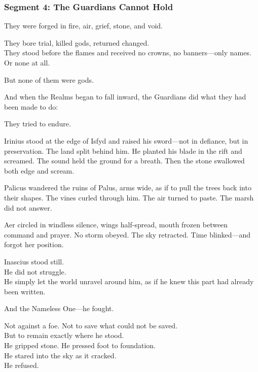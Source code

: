 \documentclass[9pt]{article}
\begin{document}
\newpage

\subsubsection*{Segment 4: The Guardians Cannot Hold}

They were forged in fire, air, grief, stone, and void.

\vspace{0.5em}
They bore trial, killed gods, returned changed.\\
They stood before the flames and received no crowns, no banners---only names.\\
Or none at all.

\vspace{0.5em}
But none of them were gods.

\vspace{0.5em}
And when the Realms began to fall inward, the Guardians did what they had been made to do:

\vspace{0.5em}
They tried to endure.

\vspace{0.5em}
Irinius stood at the edge of Isfyd and raised his sword---not in defiance, but in preservation. The land split behind him. He planted his blade in the rift and screamed. The sound held the ground for a breath. Then the stone swallowed both edge and scream.

\vspace{0.5em}
Palicus wandered the ruins of Palus, arms wide, as if to pull the trees back into their shapes. The vines curled through him. The air turned to paste. The marsh did not answer.

\vspace{0.5em}
Aer circled in windless silence, wings half-spread, mouth frozen between command and prayer. No storm obeyed. The sky retracted. Time blinked---and forgot her position.

\vspace{0.5em}
Inascius stood still.\\
He did not struggle.\\
He simply let the world unravel around him, as if he knew this part had already been written.

\vspace{0.5em}
And the Nameless One---he fought.

\vspace{0.5em}
Not against a foe. Not to save what could not be saved.\\
But to remain exactly where he stood.\\
He gripped stone. He pressed foot to foundation.\\
He stared into the sky as it cracked.\\
He refused.
\end{document}

